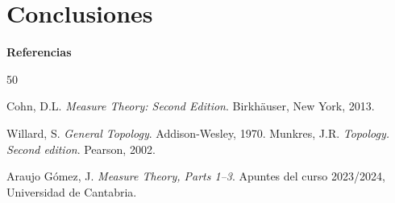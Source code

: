 \documentclass[8pt]{beamer}
\begin{document}
\section{Conclusiones}


\begin{frame}{\bf Referencias}
\begin{thebibliography}{50}

   Cohn, D.L.
  {\em Measure Theory: Second Edition}. Birkhäuser, New York, 2013.

   Willard, S.
  {\em General Topology}. Addison-Wesley, 1970.
   Munkres, J.R.
  {\em Topology. Second edition}. Pearson, 2002.

   Araujo Gómez, J.
  {\em Measure Theory, Parts 1--3}. Apuntes del curso 2023/2024, Universidad de Cantabria.



\end{thebibliography}
\end{frame}



\begin{frame}
\titlepage
\end{frame}
\end{document}
